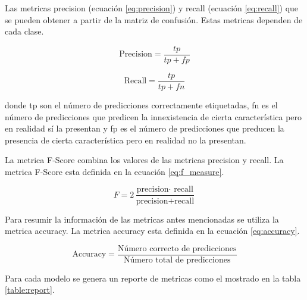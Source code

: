 Las metricas precision (ecuación \ref{eq:precision}) y recall (ecuación \ref{eq:recall}) que se pueden obtener a partir de la matriz de confusión. Estas metricas dependen de cada clase.

\begin{minipage}{0.47\linewidth}
	\begin{equation}
		\text{Precision} = \frac{tp}{tp+fp}
		\label{eq:precision}
	\end{equation}
\end{minipage}
\hspace{0.1cm}
\begin{minipage}{0.47\linewidth}
	\begin{equation}
		\text{Recall} = \frac{tp}{tp+fn}
		\label{eq:recall}
	\end{equation}
	\vspace{0.1cm}
\end{minipage}

donde tp son el número de predicciones correctamente etiquetadas, fn es el número de predicciones que predicen la innexistencia de cierta característica pero en realidad sí la presentan y fp es el número de predicciones que preducen la presencia de cierta característica pero en realidad no la presentan.

La metrica F-Score combina los valores de las metricas precision y recall. La metrica F-Score esta definida en la ecuación \ref{eq:f_measure}.

\begin{equation}
	F = 2 \frac{\text{precision} \cdot\text{ recall}}{\text{precision}+\text{recall}}
	\label{eq:f_measure}
\end{equation}

Para resumir la información de las metricas antes mencionadas se utiliza la metrica accuracy. La metrica accuracy esta definida en la ecuación \ref{eq:accuracy}.

\begin{equation}
	\text{Accuracy}=\frac{\text{Número correcto de predicciones}}{\text{Número total de predicciones}}
	\label{eq:accuracy}
\end{equation}

Para cada modelo se genera un reporte de metricas como el mostrado en la tabla \ref{table:report}.

